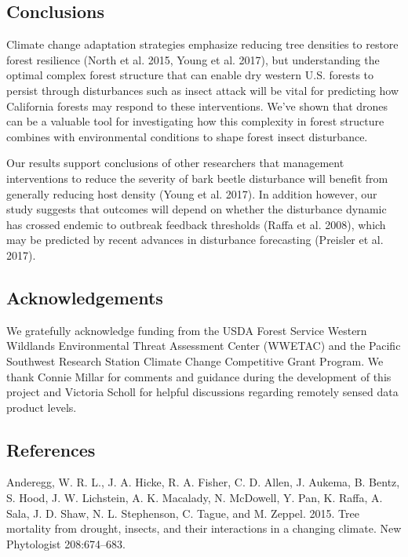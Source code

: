 \documentclass[]{article}
\begin{document}
\hypertarget{conclusions}{%
\subsection{Conclusions}\label{conclusions}}

Climate change adaptation strategies emphasize reducing tree densities
to restore forest resilience (North et al. 2015, Young et al. 2017), but
understanding the optimal complex forest structure that can enable dry
western U.S. forests to persist through disturbances such as insect
attack will be vital for predicting how California forests may respond
to these interventions. We've shown that drones can be a valuable tool
for investigating how this complexity in forest structure combines with
environmental conditions to shape forest insect disturbance.

Our results support conclusions of other researchers that management
interventions to reduce the severity of bark beetle disturbance will
benefit from generally reducing host density (Young et al. 2017). In
addition however, our study suggests that outcomes will depend on
whether the disturbance dynamic has crossed endemic to outbreak feedback
thresholds (Raffa et al. 2008), which may be predicted by recent
advances in disturbance forecasting (Preisler et al. 2017).

\hypertarget{acknowledgements}{%
\subsection{Acknowledgements}\label{acknowledgements}}

We gratefully acknowledge funding from the USDA Forest Service Western
Wildlands Environmental Threat Assessment Center (WWETAC) and the
Pacific Southwest Research Station Climate Change Competitive Grant
Program. We thank Connie Millar for comments and guidance during the
development of this project and Victoria Scholl for helpful discussions
regarding remotely sensed data product levels.

\hypertarget{references}{%
\subsection*{References}\label{references}}

\hypertarget{refs}{}
\leavevmode\hypertarget{ref-anderegg2015a}{}%
Anderegg, W. R. L., J. A. Hicke, R. A. Fisher, C. D. Allen, J. Aukema,
B. Bentz, S. Hood, J. W. Lichstein, A. K. Macalady, N. McDowell, Y. Pan,
K. Raffa, A. Sala, J. D. Shaw, N. L. Stephenson, C. Tague, and M.
Zeppel. 2015. Tree mortality from drought, insects, and their
interactions in a changing climate. New Phytologist 208:674--683.
\end{document}
